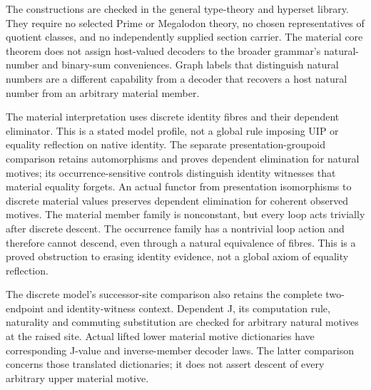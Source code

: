 \documentclass[11pt]{article}
\theoremstyle{definition}
\theoremstyle{remark}
\begin{document}
The constructions are checked in the general type-theory and hyperset library.
They require no selected Prime or Megalodon theory, no chosen representatives
of quotient classes, and no independently supplied section carrier.  The
material core theorem does not assign host-valued decoders to the broader
grammar's natural-number and binary-sum conveniences.  Graph labels that
distinguish natural numbers are a different capability from a decoder that
recovers a host natural number from an arbitrary material member.

The material interpretation uses discrete identity fibres and their dependent
eliminator.  This is a stated model profile, not a global rule imposing UIP or
equality reflection on native identity.  The separate presentation-groupoid
comparison retains automorphisms and proves dependent elimination for natural
motives; its occurrence-sensitive controls distinguish identity witnesses that
material equality forgets.  An actual functor from presentation isomorphisms
to discrete material values preserves dependent elimination for coherent
observed motives.  The material member family is nonconstant, but every loop
acts trivially after discrete descent.  The occurrence family has a nontrivial
loop action and therefore cannot descend, even through a natural equivalence
of fibres.  This is a proved obstruction to erasing identity evidence, not a
global axiom of equality reflection.

The discrete model's successor-site comparison also retains the complete
two-endpoint and identity-witness context.  Dependent J, its computation
rule, naturality and commuting substitution are checked for arbitrary
natural motives at the raised site.  Actual lifted lower material motive
dictionaries have corresponding J-value and inverse-member decoder laws.
The latter comparison concerns those translated dictionaries; it does not
assert descent of every arbitrary upper material motive.
\end{document}
